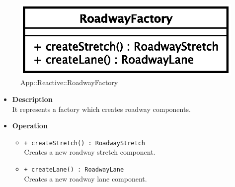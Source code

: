 \begin{figure}[h]
\centering
\includegraphics[scale=0.6,keepaspectratio]{images/solution/roadway_factory.eps}
\caption{App::Reactive::RoadwayFactory}
\label{fig:sd-app-roadway-factory}
\end{figure}
\FloatBarrier
\begin{itemize}
  \item \textbf{Description} \\
It represents a factory which creates roadway components.
  \item \textbf{Operation} \\
  \begin{itemize} 
    \item \texttt{+ createStretch() : RoadwayStretch} \\
Creates a new roadway stretch component.
    \item \texttt{+ createLane() : RoadwayLane} \\
Creates a new roadway lane component.
  \end{itemize}
\end{itemize}
